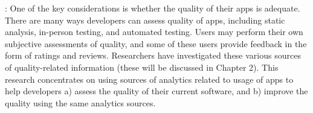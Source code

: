 \medskip
{}: One of the key considerations is whether the quality of their apps is adequate. There are many ways developers can assess quality of apps, including static analysis, in-person testing, and automated testing. Users may perform their own subjective assessments of quality, and some of these users provide feedback in the form of ratings and reviews. Researchers have investigated these various sources of quality-related information (these will be discussed in Chapter 2). This research concentrates on using sources of analytics related to usage of apps to help developers a) assess the quality of their current software, and b) improve the quality using the same analytics sources.


